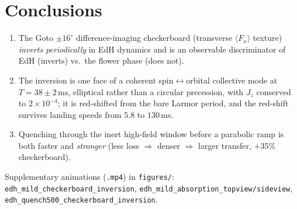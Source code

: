 \documentclass[11pt]{article}
\newcommand{\Fx}{\langle F_x\rangle}
\newcommand{\Jz}{J_z}
\newcommand{\ms}{\,\mathrm{ms}}
\begin{document}
\section{Conclusions}
\begin{enumerate}\itemsep2pt
  \item The Goto $\pm16^\circ$ difference-imaging checkerboard (transverse
        $\Fx$ texture) \emph{inverts periodically} in EdH dynamics and is an
        observable discriminator of EdH (inverts) vs.\ the flower phase (does not).
  \item The inversion is one face of a coherent spin$\leftrightarrow$orbital
        collective mode at $T=38\pm2\ms$, elliptical rather than a circular
        precession, with $\Jz$ conserved to $2\times10^{-4}$; it is red-shifted from
        the bare Larmor period, and the red-shift survives landing speeds from
        $5.8$ to $130\ms$.
  \item Quenching through the inert high-field window before a parabolic ramp is
        both faster and \emph{stronger} (less loss $\Rightarrow$ denser $\Rightarrow$
        larger transfer, $+35\%$ checkerboard).
\end{enumerate}
Supplementary animations (\texttt{.mp4}) in \texttt{figures/}:
\texttt{edh\_mild\_checkerboard\_inversion}, \texttt{edh\_mild\_absorption\_topview/sideview},
\texttt{edh\_quench500\_checkerboard\_inversion}.
\end{document}
